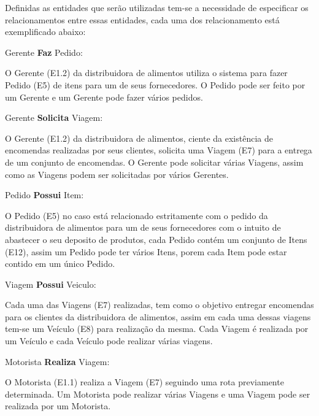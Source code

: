 \documentclass[12pt, onecolumn, titlepage]{article}
\begin{document}
Definidas as entidades que serão utilizadas tem-se a necessidade de especificar os relacionamentos entre essas entidades, cada uma dos relacionamento está exemplificado abaixo:

\begin{description}

\item Gerente \textbf{Faz} Pedido: 
\item \qquad O Gerente (E1.2) da distribuidora de alimentos utiliza o sistema para fazer Pedido (E5) de itens para um de seus fornecedores. O Pedido pode ser feito por um Gerente e um Gerente pode fazer vários pedidos.


\item Gerente \textbf{Solicita} Viagem: 
\item \qquad O Gerente (E1.2) da distribuidora de alimentos, ciente da existência de encomendas realizadas por seus clientes, solicita uma Viagem (E7) para a entrega de um conjunto de encomendas. O Gerente pode solicitar várias Viagens, assim como as Viagens podem ser solicitadas por vários Gerentes.

\item Pedido \textbf{Possui} Item: 
\item \qquad O Pedido (E5) no caso está relacionado estritamente com o pedido da distribuidora de alimentos para um de seus fornecedores com o intuito de abastecer o seu deposito de produtos, cada Pedido contém um conjunto de Itens (E12), assim um Pedido pode ter vários Itens, porem cada Item pode estar contido em um único Pedido.

\item Viagem \textbf{Possui} Veiculo: 
\item \qquad Cada uma das Viagens (E7) realizadas, tem como o objetivo entregar encomendas para os clientes da distribuidora de alimentos, assim em cada uma dessas viagens tem-se um Veículo (E8) para realização da mesma. Cada Viagem é realizada por um Veículo e cada Veículo pode realizar várias viagens.

\item Motorista \textbf{Realiza} Viagem: 
\item \qquad O Motorista (E1.1) realiza a Viagem (E7) seguindo uma rota previamente determinada. Um Motorista pode realizar várias Viagens e uma Viagem pode ser realizada por um Motorista.


\end{description}
\end{document}
